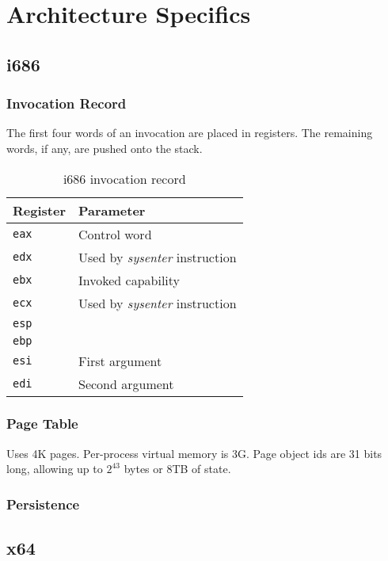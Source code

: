 \chapter{Architecture Specifics}

\section{i686}

\subsection{Invocation Record}

The first four words of an invocation are placed in registers.  The remaining words, if any, are pushed onto the stack.

\begin{table}[ht]
\begin{tabular}{l l}
\hline\hline
Register & Parameter \\
\hline
{\tt eax}  &  Control word \\
{\tt edx}  &  Used by {\em sysenter} instruction \\
{\tt ebx}  &  Invoked capability\\
{\tt ecx}  &  Used by {\em sysenter} instruction\\
{\tt esp}  &  \\
{\tt ebp}  &  \\
{\tt esi}  &  First argument \\
{\tt edi}  &  Second argument \\
\hline
\end{tabular}
\caption{i686 invocation record}
\label{table:i686invocation}
\end{table}

\subsection{Page Table}

Uses 4K pages.  Per-process virtual memory is 3G.  Page object ids are 31 bits long, allowing up to $2^{43}$ bytes or 8TB of state.

\subsection{Persistence}


\section{x64}
